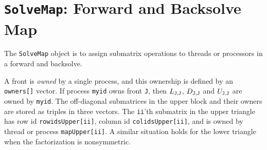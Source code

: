 \chapter{{\tt SolveMap}: Forward and Backsolve Map}
\par
The {\tt SolveMap} object is to assign submatrix operations to
threads or processors in a forward and backsolve.
\par
A front is {\it owned} by a single process,
and this ownership is defined by an {\tt owners[]} vector.
If process {\tt myid} owns front {\tt J}, then 
$L_{{\tt J},{\tt J}}$, $D_{{\tt J},{\tt J}}$ and $U_{{\tt J},{\tt J}}$
are owned by {\tt myid}.
The off-diagonal submatrices in the upper block 
and their owners are stored as triples in three vectors.
The {\tt ii}'th submatrix in the upper triangle has 
row id {\tt rowidsUpper[ii]},
column id {\tt colidsUpper[ii]},
and is owned by thread or process {\tt mapUpper[ii]}.
A similar situation holds for the lower triangle when the
factorization is nonsymmetric.
\par
